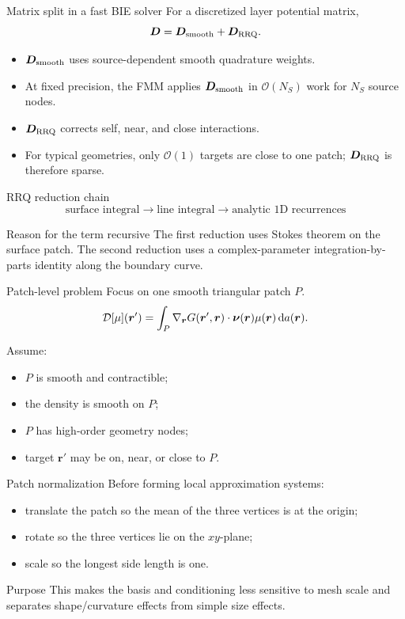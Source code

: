 \documentclass[aspectratio=169,11pt]{beamer}
\newcommand{\cO}{\mathcal{O}}
\newcommand{\dd}{\,\mathrm d}
\newcommand{\rvec}{\bm{r}}
\newcommand{\rp}{\bm{r}'}
\newcommand{\nuvec}{\bm{\nu}}
\begin{document}
\begin{frame}{Matrix split in a fast BIE solver}
\small
For a discretized layer potential matrix,
\[
  \bm D=\bm D_{\rm smooth}+\bm D_{\rm RRQ}.
\]

\begin{itemize}
  \item $\bm D_{\rm smooth}$ uses source-dependent smooth quadrature weights.
  \item At fixed precision, the FMM applies $\bm D_{\rm smooth}$ in
  $\cO(N_S)$ work for $N_S$ source nodes.
  \item $\bm D_{\rm RRQ}$ corrects self, near, and close interactions.
  \item For typical geometries, only $\cO(1)$ targets are close to one patch;
  $\bm D_{\rm RRQ}$ is therefore sparse.
\end{itemize}
\end{frame}

\begin{frame}{RRQ reduction chain}
\small
\[
  \boxed{
  \text{surface integral}
  \longrightarrow
  \text{line integral}
  \longrightarrow
  \text{analytic 1D recurrences}
  }
\]

\begin{block}{Reason for the term recursive}
The first reduction uses Stokes theorem on the surface patch. The second
reduction uses a complex-parameter integration-by-parts identity along the boundary
curve.
\end{block}
\end{frame}

\begin{frame}{Patch-level problem}
\small
Focus on one smooth triangular patch $P$.
\[
  \Dop[\mu](\rp)
  =
  \int_P
  \nabla_{\rvec} G(\rp,\rvec)\cdot\nuvec(\rvec)
  \mu(\rvec)\dd a(\rvec).
\]

Assume:
\begin{itemize}
  \item $P$ is smooth and contractible;
  \item the density is smooth on $P$;
  \item $P$ has high-order geometry nodes;
  \item target $\rp$ may be on, near, or close to $P$.
\end{itemize}
\end{frame}

\begin{frame}{Patch normalization}
\small
Before forming local approximation systems:
\begin{itemize}
  \item translate the patch so the mean of the three vertices is at the origin;
  \item rotate so the three vertices lie on the $xy$-plane;
  \item scale so the longest side length is one.
\end{itemize}

\begin{block}{Purpose}
This makes the basis and conditioning less sensitive to mesh scale and
separates shape/curvature effects from simple size effects.
\end{block}
\end{frame}
\end{document}
